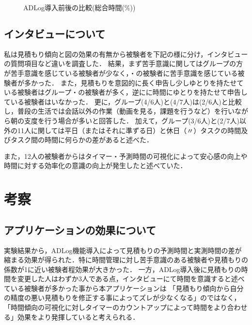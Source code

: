 \begin{figure}[hb]
	\begin{center}
		\caption{ADLog導入前後の比較(総合時間(\%))}
		\label{fig:14}
	\end{center}
\end{figure}


\subsection{インタビューについて}
私は見積もり傾向と図の効果の有無から被験者を下記の様に分け，インタビューの質問項目など違いを調査した．
結果，まず苦手意識に関してはグループの方が苦手意識を感じている被験者が少なく，・の被験者に苦手意識を感じている被験者が多かった．
また，見積もりを意図的に長く申告し少しゆとりを持たせている被験者はグループ・の被験者が多く，逆にに時間にゆとりを持たせて申告している被験者はいなかった．
更に，グループ(4/6人)と(4/7人)は(2/6人)と比較し，普段の生活では会話以外の作業（動画を見る，課題を行うなど）を行いながら朝の支度を行う場合が多いと回答した．
加えて，グループ(3/6人)と(2/7人)以外の11人に関しては平日（またはそれに準ずる日）と休日（〃）タスクの時間及びタスク間の時間に何らかの差があると述べた．

また，12人の被験者からはタイマー・予測時間の可視化によって安心感の向上や時間に対する効率化の意識の向上が発生したと述べていた．
\section{考察}
\subsection{アプリケーションの効果について}
実験結果から，ADLog機能導入によって見積もりの予測時間と実測時間の差が縮まる効果が得られた．特に時間管理に対し苦手意識のある被験者や見積もりの係数が1に近い被験者程効果が大きかった．
一方，ADLog導入後に見積もりの時間を変更した人はわずか3人である点，インタビューにて時間を意識すると述べている被験者が多かった事から本アプリケーションは
「見積もり傾向から自分の精度の悪い見積もりを修正する事によってズレが少なくなる」のではなく，「時間傾向の可視化に対しタイマーのカウントアップによって時間をより合わせる」効果をより発揮していると考えられる．

